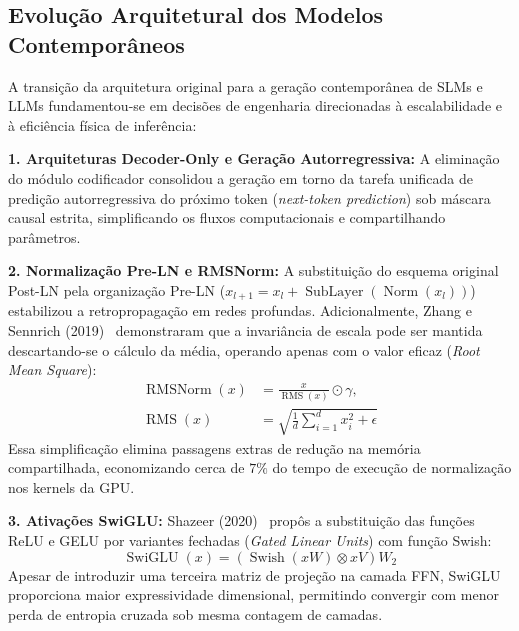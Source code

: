 \documentclass[10pt,a4paper,twocolumn]{article}
\begin{document}
\subsection{Evolu\c{c}\~ao Arquitetural dos Modelos Contempor\^aneos}

A transi\c{c}\~ao da arquitetura original para a gera\c{c}\~ao contempor\^anea de SLMs e LLMs fundamentou-se em decis\~oes de engenharia direcionadas \`a escalabilidade e \`a efici\^encia f\'isica de infer\^encia:

\textbf{1. Arquiteturas Decoder-Only e Gera\c{c}\~ao Autorregressiva:} A elimina\c{c}\~ao do m\'odulo codificador consolidou a gera\c{c}\~ao em torno da tarefa unificada de predi\c{c}\~ao autorregressiva do pr\'oximo token (\emph{next-token prediction}) sob m\'ascara causal estrita, simplificando os fluxos computacionais e compartilhando par\^ametros.

\textbf{2. Normaliza\c{c}\~ao Pre-LN e RMSNorm:} A substitui\c{c}\~ao do esquema original Post-LN pela organiza\c{c}\~ao Pre-LN ($x_{l+1} = x_l + \operatorname{SubLayer}(\operatorname{Norm}(x_l))$) estabilizou a retropropaga\c{c}\~ao em redes profundas. Adicionalmente, Zhang e Sennrich (2019)~\cite{zhang2019} demonstraram que a invari\^ancia de escala pode ser mantida descartando-se o c\'alculo da m\'edia, operando apenas com o valor eficaz (\emph{Root Mean Square}):
\begin{equation}
\begin{aligned}
\operatorname{RMSNorm}(x) &= \frac{x}{\operatorname{RMS}(x)} \odot \gamma,\\
\operatorname{RMS}(x) &= \sqrt{\frac{1}{d}\sum_{i=1}^d x_i^2 + \epsilon}
\end{aligned}
\end{equation}
Essa simplifica\c{c}\~ao elimina passagens extras de redu\c{c}\~ao na mem\'oria compartilhada, economizando cerca de $7\%$ do tempo de execu\c{c}\~ao de normaliza\c{c}\~ao nos kernels da GPU.

\textbf{3. Ativa\c{c}\~oes SwiGLU:} Shazeer (2020)~\cite{shazeer2020} prop\^os a substitui\c{c}\~ao das fun\c{c}\~oes ReLU e GELU por variantes fechadas (\emph{Gated Linear Units}) com fun\c{c}\~ao Swish:
\begin{equation}
\operatorname{SwiGLU}(x) = \left(\operatorname{Swish}(xW) \otimes xV\right)W_2
\end{equation}
Apesar de introduzir uma terceira matriz de proje\c{c}\~ao na camada FFN, SwiGLU proporciona maior expressividade dimensional, permitindo convergir com menor perda de entropia cruzada sob mesma contagem de camadas.
\end{document}

